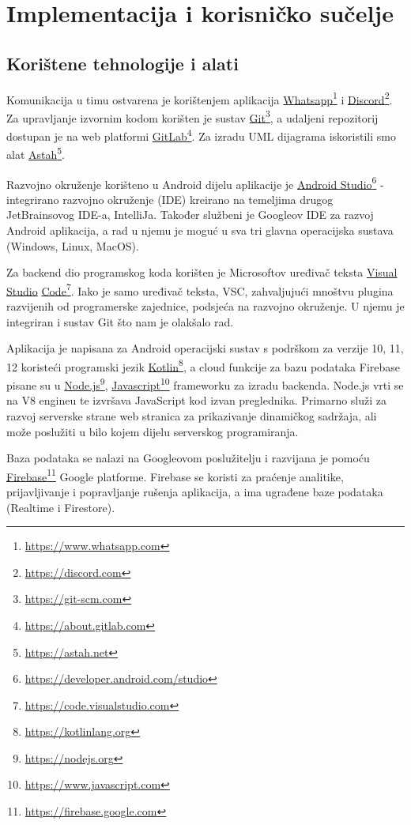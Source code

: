 \chapter{Implementacija i korisničko sučelje}
		
		
		\section{Korištene tehnologije i alati}
		
		Komunikacija u timu ostvarena je korištenjem aplikacija \underline{Whatsapp}\footnote{\url{https://www.whatsapp.com}} i \underline{Discord}\footnote{\url{https://discord.com}}. 
		Za upravljanje izvornim kodom korišten je sustav \underline{Git}\footnote{\url{https://git-scm.com}}, a udaljeni repozitorij dostupan je na web platformi \underline{GitLab}\footnote{\url{https://about.gitlab.com}}. 
		Za izradu UML dijagrama iskoristili smo alat \underline{Astah}\footnote{\url{https://astah.net}}.

		Razvojno okruženje korišteno u Android dijelu aplikacije je \underline{Android Studio}\footnote{\url{https://developer.android.com/studio}} - integrirano 
		razvojno okruženje (IDE) kreirano na temeljima drugog JetBrainsovog IDE-a, IntelliJa. Također službeni je Googleov IDE za razvoj Android aplikacija, a rad u njemu je moguć
		u sva tri glavna operacijska sustava (Windows, Linux, MacOS).
		
		Za backend dio programskog koda korišten je Microsoftov uređivač teksta \underline{Visual} \underline{Studio} \underline{Code}\footnote{\url{https://code.visualstudio.com}}. 
		Iako je samo uređivač teksta,
		VSC, zahvaljujući mnoštvu plugina razvijenih od programerske zajednice, podsjeća na razvojno okruženje. U njemu je integriran i sustav Git što nam je olakšalo rad.

		Aplikacija je napisana za Android operacijski sustav s podrškom za verzije 10, 11, 12 koristeći programski jezik \underline{Kotlin}\footnote{\url{https://kotlinlang.org}}, 
		a cloud funkcije za bazu podataka Firebase pisane su u \underline{Node.js}\footnote{\url{https://nodejs.org}}, \underline{Javascript}\footnote{\url{https://www.javascript.com}}
		frameworku za izradu backenda. Node.js vrti se na V8 engineu te izvršava JavaScript kod izvan preglednika. Primarno služi za razvoj serverske strane web stranica
		za prikazivanje dinamičkog sadržaja, ali može poslužiti u bilo kojem dijelu serverskog programiranja. 

		Baza podataka se nalazi na Googleovom poslužitelju i razvijana je pomoću \underline{Firebase}\footnote{\url{https://firebase.google.com}} Google platforme.
		Firebase se koristi za praćenje analitike, prijavljivanje i popravljanje rušenja aplikacija, a ima ugrađene baze podataka (Realtime i Firestore).

